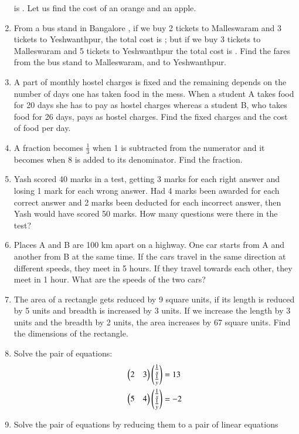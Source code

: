 \begin{enumerate}[label=\arabic*.,ref=\thesubsection.\theenumi]
is . Let us find the cost of an orange and an apple.
%
\item From a bus stand in Bangalore , if we buy 2 tickets to Malleswaram and 3 tickets to Yeshwanthpur, the total cost is ; but if we buy 3 tickets to Malleswaram and 5 tickets to Yeshwanthpur the total cost is . Find the fares from the bus stand to Malleswaram, and to Yeshwanthpur.
%
\item  A part of monthly hostel charges is fixed and the remaining depends on the number of days one has taken food in the mess. When a student A takes food for 20 days she has to pay  as hostel charges whereas a student B, who takes food for 26 days, pays  as hostel charges. Find the fixed charges and the cost of food per day.
\item A fraction becomes 
$\frac{1}{ 3}$
when 1 is subtracted from the numerator and it becomes when 8 is added to its denominator. Find the fraction.
\item Yash scored 40 marks in a test, getting 3 marks for each right answer and losing 1 mark for each wrong answer. Had 4 marks been awarded for each correct answer and 2 marks been deducted for each incorrect answer, then Yash would have scored 50 marks. How many questions were there in the test?
\item Places A and B are 100 km apart on a highway. One car starts from A and another from B at the same time. If the cars travel in the same direction at different speeds, they meet in 5 hours. If they travel towards each other, they meet in 1 hour. What are the speeds of the two cars?
\item The area of a rectangle gets reduced by 9 square units, if its length is reduced by 5 units and breadth is increased by 3 units. If we increase the length by 3 units and the breadth by 2 units, the area increases by 67 square units. Find the dimensions of the rectangle.
%
\item Solve the pair of equations:
%
\begin{align}
\begin{split}
\begin{pmatrix}2 & 3 \end{pmatrix}\begin{pmatrix}\frac{1}{x} \\ \frac{1}{y}\end{pmatrix}&=13
\\
\begin{pmatrix}5 & 4 \end{pmatrix}\begin{pmatrix}\frac{1}{x} \\ \frac{1}{y}\end{pmatrix}&=-2
\end{split}
\end{align}
%
%
\item Solve the pair of equations by reducing them to a pair of linear equations

\end{enumerate}

